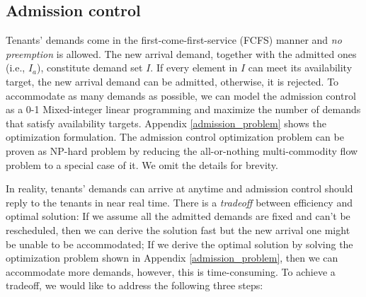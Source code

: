 \documentclass[sigconf]{acmart}
\begin{document}
\subsection {Admission control} \label{admission_control}
Tenants' demands come in the first-come-first-service (FCFS) manner and \textit {no preemption} is allowed.
The new arrival demand, together with the admitted ones (i.e., $I_a$), constitute demand set $I$.
If every element in $I$ can meet its availability target, the new arrival demand can be admitted, otherwise, it is rejected.
To accommodate as many demands as possible, we can model the admission control as a 0-1 Mixed-integer linear programming and maximize the number of demands that satisfy availability targets.
Appendix \ref{admission_problem} shows the optimization formulation.
The admission control optimization problem can be proven as NP-hard problem by reducing the all-or-nothing multi-commodity flow problem \cite{inproceedings2} to a special case of it.
We omit the details for brevity.

In reality, tenants' demands can arrive at anytime and admission control should reply to the tenants in near real time.
There is a \textit{tradeoff} between efficiency and optimal solution:
If we assume all the admitted demands are fixed and can't be rescheduled, then we can derive the solution fast but the new arrival one might be unable to be accommodated;
If we derive the optimal solution  by solving the optimization problem shown in Appendix \ref{admission_problem}, then we can accommodate more demands, however, this is time-consuming.
To achieve a tradeoff, we would like to address the following three steps:
\end{document}
